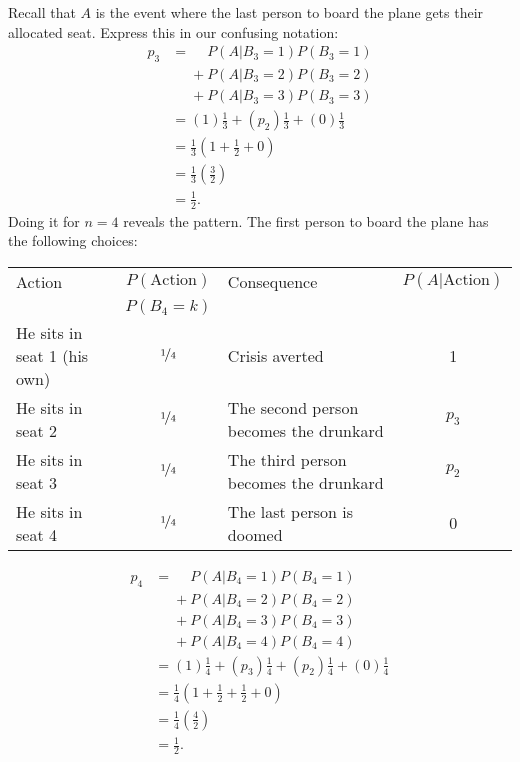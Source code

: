 \documentclass[a4paper]{article}
\begin{document}
Recall that $A$ is the event where the last person to board the plane gets their allocated seat. Express this in our confusing notation:
\begin{align*}
  p_3
  &=
       \phantom{{} + {}}    P(A|B_3 = 1)P(B_3=1) \\
      &\phantom{{} = {}} +  P(A|B_3 = 2)P(B_3=2) \\
      &\phantom{{} = {}} +  P(A|B_3 = 3)P(B_3=3)
  \\
  &=
  (1)   \frac{1}{3}  +
  (p_2) \frac{1}{3} +
  (0)   \frac{1}{3} \\
& =\frac{1}{3}\left(1 +  \frac{1}{2} + 0\right) \\
& =\frac{1}{3}\left(\frac{3}{2}\right)  \\
& =\frac{1}{2}
\text{.}
\end{align*}
Doing it for $n=4$ reveals the pattern.
The first person to board the plane has the following choices:
\begin{center}
\begin{tabular}{lclc}
\hline
 Action                    & $P(\text{Action})$ &  Consequence                             & $P(A|\text{Action})$ \\
                           & $P(B_4 = k)$       &                                          &               \\
 \hline
He sits in seat 1 (his own)& $\nicefrac{1}{4}$  &  Crisis averted                          & 1\\
He sits in seat 2          & $\nicefrac{1}{4}$  &  The second person becomes the drunkard  & $p_3$\\
He sits in seat 3          & $\nicefrac{1}{4}$  &  The third person becomes the drunkard   & $p_2$\\
He sits in seat 4          & $\nicefrac{1}{4}$  &  The last person is doomed               & 0\\
\hline
\end{tabular}
\end{center}
\begin{align*}
  p_4
      &=  \phantom{{} + {}} P(A|B_4 = 1)P(B_4=1) \\
      &\phantom{{} = {}} +  P(A|B_4 = 2)P(B_4=2) \\
      &\phantom{{} = {}} +  P(A|B_4 = 3)P(B_4=3) \\
      &\phantom{{} = {}} +  P(A|B_4 = 4)P(B_4=4)
  \\
 & =
  (1)   \frac{1}{4} +
  (p_3) \frac{1}{4} +
  (p_2) \frac{1}{4} +
  (0)   \frac{1}{4} \\
& =\frac{1}{4}\left(1 +  \frac{1}{2} + \frac{1}{2} + 0\right) \\
& =\frac{1}{4}\left(\frac{4}{2}\right)  \\
& =\frac{1}{2}
\text{.}
\end{align*}
\end{document}
